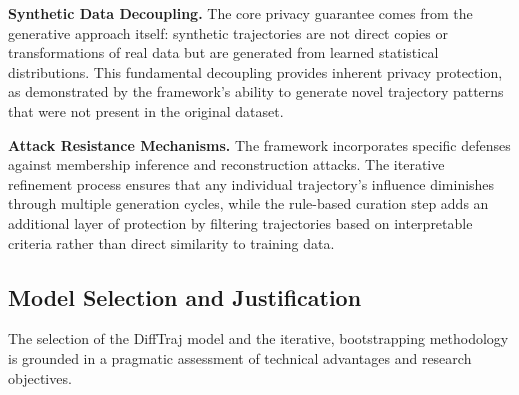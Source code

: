 \documentclass[runningheads]{llncs}
\begin{document}
\textbf{Synthetic Data Decoupling.} The core privacy guarantee comes from the generative approach itself: synthetic trajectories are not direct copies or transformations of real data but are generated from learned statistical distributions. This fundamental decoupling provides inherent privacy protection, as demonstrated by the framework's ability to generate novel trajectory patterns that were not present in the original dataset.

\textbf{Attack Resistance Mechanisms.} The framework incorporates specific defenses against membership inference and reconstruction attacks. The iterative refinement process ensures that any individual trajectory's influence diminishes through multiple generation cycles, while the rule-based curation step adds an additional layer of protection by filtering trajectories based on interpretable criteria rather than direct similarity to training data.

\subsection{Model Selection and Justification}
\label{sec:model-selection}

The selection of the DiffTraj model and the iterative, bootstrapping methodology is grounded in a pragmatic assessment of technical advantages and research objectives.
\end{document}
